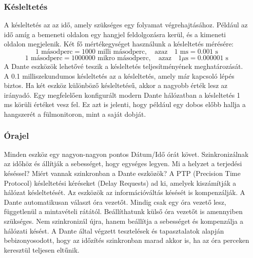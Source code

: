 \subsubsection{Késleltetés}
A késleltetés az az idő, amely szükséges egy folyamat végrehajtásához. Például
az idő amíg a bemeneti oldalon egy hangjel feldolgozásra kerül, és a kimeneti
oldalon megjelenik. 
Két fő mértékegységet használunk a késleltetés mérésére:
\begin{equation}
	\label{eq:milliseconds}
	1 \text{ másodperc} = 1000 \text{ milli másodperc}, \quad \text{azaz} \quad 1 \text{ ms} = 0.001 \text{ s}
\end{equation}
\begin{equation}
	\label{eq:microseconds}
	1 \text{ másodperc} = 1000000 \text{ mikro másodperc}, \quad \text{azaz} \quad 1 \mu\text{s} = 0.000001 \text{ s}
\end{equation}
A Dante eszközök lehetővé teszik a késleltetés teljesítményének meghatározását. 
A 0.1 milliszekundumos késleltetés az a késleltetés, amely már kapcsoló lépés biztos.
Ha két eszköz különböző késleltetésű, akkor a nagyobb érték lesz az irányadó.
Egy megfelelően konfigurált modern Dante hálózatban a késleltetés 1 ms körüli értéket vesz fel.
Ez azt is jelenti, hogy például egy dobos előbb hallja a hangszerét a fülmonitoron, mint a saját dobját.

\subsubsection{Órajel}

Minden eszköz egy nagyon-nagyon pontos Dátum/Idő órát követ.
Szinkronizálnak az időhöz és állítják a sebességet, hogy egységes legyen.
Mi a helyzet a terjedési késéssel? Miért vannak szinkronban a Dante eszközök?
A PTP (Precision Time Protocol) késleltetési kéréseket (Delay Requests)
ad ki, amelyek kiszámítják a hálózat késleltetését. 
Az eszközök az információváltás késését is kompenzálják.
A Dante automatikusan választ óra vezetőt.
Mindig csak egy óra vezető lesz, függetlenül a mintavételi rátától.
Beállíthatunk külső óra vezetőt is amennyiben szükséges.
Nem szinkronizál újra, hanem beállítja a sebességet és kompenzálja a hálózati késést.
A Dante által végzett tesztelések és tapasztalatok alapján
bebizonyosodott, hogy az időzítés szinkronban marad akkor is,
ha az óra perceken keresztül teljesen eltűnik.


